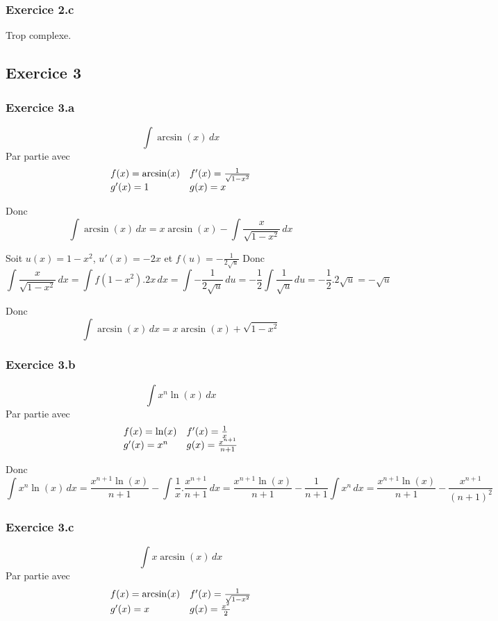 \documentclass[]{book}
\theoremstyle{definition}
\begin{document}
\subsubsection*{Exercice 2.c}
Trop complexe.

\subsection*{Exercice 3}
\subsubsection*{Exercice 3.a}
$$\int{\arcsin(x)\,dx}$$
Par partie avec
$$
\begin{array}{l l}
f(x) = \arcsin(x) & f'(x)=\frac{1}{\sqrt{1-x^2}} \\
g'(x)= 1 & g(x) = x \\
\end{array}
$$

Donc
$$\int{\arcsin(x)\,dx} = x\arcsin(x) - \int{\frac{x}{\sqrt{1-x^2}}\,dx}$$

Soit $u(x)=1-x^2$, $u'(x)=-2x$ et $f(u)=-\frac{1}{2\sqrt{u}}$
Donc
$$\int{\frac{x}{\sqrt{1-x^2}}\,dx} = \int{f(1-x^2).2x\,dx} = \int{-\frac{1}{2\sqrt{u}}\,du} = -\frac{1}{2}\int{\frac{1}{\sqrt{u}}\,du} = -\frac{1}{2}.2\sqrt{u} = -\sqrt{u}$$

Donc
$$\int{\arcsin(x)\,dx} = x\arcsin(x) + \sqrt{1-x^2}$$

\subsubsection*{Exercice 3.b}
$$\int{x^n\ln(x)\,dx}$$
Par partie avec
$$
\begin{array}{l l}
f(x) = \ln(x) & f'(x)=\frac{1}{x} \\
g'(x)= x^n & g(x) = \frac{x^{n+1}}{n+1} \\
\end{array}
$$

Donc
$$\int{x^n\ln(x)\,dx} = \frac{x^{n+1}\ln(x)}{n+1} - \int{\frac{1}{x}.\frac{x^{n+1}}{n+1}\,dx} = \frac{x^{n+1}\ln(x)}{n+1} - \frac{1}{n+1}\int{x^n\,dx} = \frac{x^{n+1}\ln(x)}{n+1} - \frac{x^{n+1}}{(n+1)^2}$$


\subsubsection*{Exercice 3.c}
$$\int{x\arcsin(x)\,dx}$$
Par partie avec
$$
\begin{array}{l l}
f(x) = \arcsin(x) & f'(x)=\frac{1}{\sqrt{1-x^2}} \\
g'(x)= x & g(x) = \frac{x^{2}}{2} \\
\end{array}
$$
\end{document}
